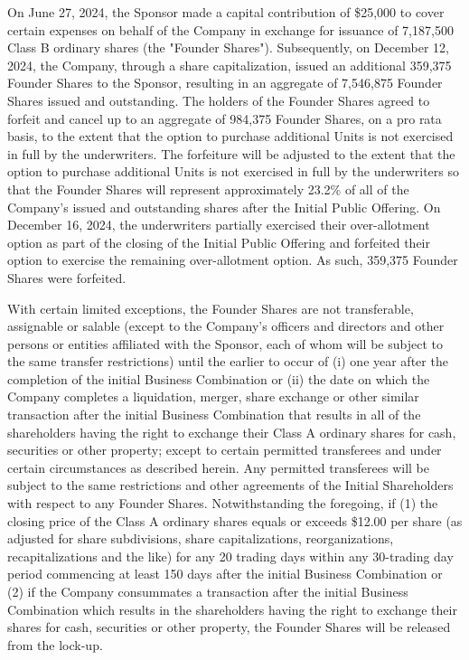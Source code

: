 \documentclass[11pt,a4paper]{article}
\begin{document}
On June 27, 2024, the Sponsor made a capital contribution of \$25,000 to cover certain expenses on behalf of the Company in exchange for issuance of 7,187,500 Class B ordinary shares (the "Founder Shares"). Subsequently, on December 12, 2024, the Company, through a share capitalization, issued an additional 359,375 Founder Shares to the Sponsor, resulting in an aggregate of 7,546,875 Founder Shares issued and outstanding. The holders of the Founder Shares agreed to forfeit and cancel up to an aggregate of 984,375 Founder Shares, on a pro rata basis, to the extent that the option to purchase additional Units is not exercised in full by the underwriters. The forfeiture will be adjusted to the extent that the option to purchase additional Units is not exercised in full by the underwriters so that the Founder Shares will represent approximately 23.2\% of all of the Company's issued and outstanding shares after the Initial Public Offering. On December 16, 2024, the underwriters partially exercised their over-allotment option as part of the closing of the Initial Public Offering and forfeited their option to exercise the remaining over-allotment option. As such, 359,375 Founder Shares were forfeited.

With certain limited exceptions, the Founder Shares are not transferable, assignable or salable (except to the Company's officers and directors and other persons or entities affiliated with the Sponsor, each of whom will be subject to the same transfer restrictions) until the earlier to occur of (i) one year after the completion of the initial Business Combination or (ii) the date on which the Company completes a liquidation, merger, share exchange or other similar transaction after the initial Business Combination that results in all of the shareholders having the right to exchange their Class A ordinary shares for cash, securities or other property; except to certain permitted transferees and under certain circumstances as described herein. Any permitted transferees will be subject to the same restrictions and other agreements of the Initial Shareholders with respect to any Founder Shares. Notwithstanding the foregoing, if (1) the closing price of the Class A ordinary shares equals or exceeds \$12.00 per share (as adjusted for share subdivisions, share capitalizations, reorganizations, recapitalizations and the like) for any 20 trading days within any 30-trading day period commencing at least 150 days after the initial Business Combination or (2) if the Company consummates a transaction after the initial Business Combination which results in the shareholders having the right to exchange their shares for cash, securities or other property, the Founder Shares will be released from the lock-up.
\end{document}
